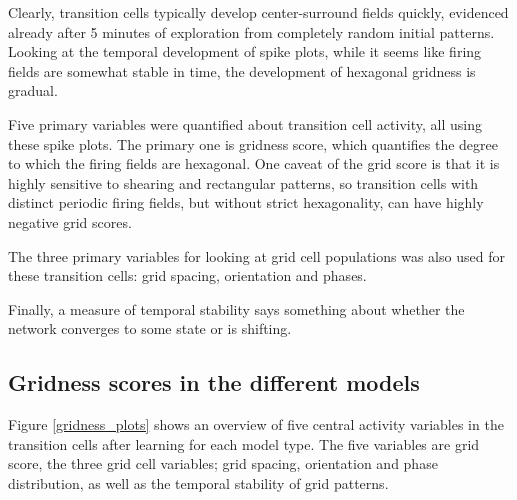 \documentclass{article}
\begin{document}
    Clearly, transition cells typically develop center-surround fields quickly, evidenced already after 5 minutes of exploration from completely random initial patterns. Looking at the temporal development of spike plots, while it seems like firing fields are somewhat stable in time, the development of hexagonal gridness is gradual.

    Five primary variables were quantified about transition cell activity, all using these spike plots. The primary one is gridness score, which quantifies the degree to which the firing fields are hexagonal. One caveat of the grid score is that it is highly sensitive to shearing and rectangular patterns, so transition cells with distinct periodic firing fields, but without strict hexagonality, can have highly negative grid scores.
    
    The three primary variables for looking at grid cell populations was also used for these transition cells: grid spacing, orientation and phases. 
    
    Finally, a measure of temporal stability says something about whether the network converges to some state or is shifting. 

    \subsection{Gridness scores in the different models}

    Figure \ref{gridness_plots} shows an overview of five central activity variables in the transition cells after learning for each model type. The five variables are grid score, the three grid cell variables; grid spacing, orientation and phase distribution, as well as the temporal stability of grid patterns. 
    
\end{document}
